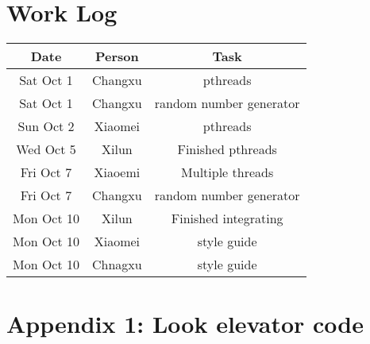 \documentclass[letterpaper,10pt]{article}
\begin{document}
\section*{Work Log}
\begin{tabular}{@{}ccc@{}}
    \toprule
    Date                & Person   & Task                                                      \\ \midrule
    Sat Oct 1           & Changxu  & pthreads                                                  \\
    Sat Oct 1           & Changxu  & random number generator                                   \\
    Sun Oct 2           & Xiaomei  & pthreads                                                  \\
    Wed Oct 5           & Xilun    & Finished pthreads                                         \\
    Fri Oct 7           & Xiaoemi  & Multiple threads                                          \\
    Fri Oct 7           & Changxu  & random number generator                                   \\
    Mon Oct 10          & Xilun    & Finished integrating                                      \\
    Mon Oct 10          & Xiaomei  & style guide                                               \\
    Mon Oct 10          & Chnagxu  & style guide                                               \\ \bottomrule
\end{tabular}

\newpage
\section*{Appendix 1: Look elevator code}

\end{document}
